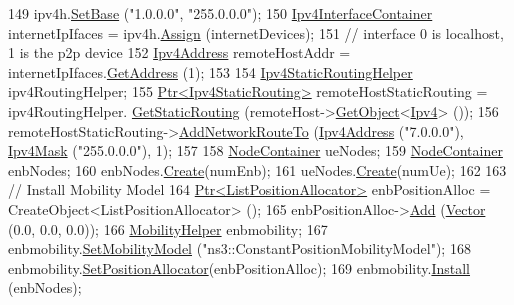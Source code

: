 \begin{DoxyCode}
149   ipv4h.\hyperlink{classns3_1_1Ipv4AddressHelper_acf7b16dd25bac67e00f5e25f90a9a035}{SetBase} (\textcolor{stringliteral}{"1.0.0.0"}, \textcolor{stringliteral}{"255.0.0.0"});
150   \hyperlink{classns3_1_1Ipv4InterfaceContainer}{Ipv4InterfaceContainer} internetIpIfaces = ipv4h.\hyperlink{classns3_1_1Ipv4AddressHelper_af8e7f4a1a7e74c00014a1eac445a27af}{Assign} (internetDevices);
151   \textcolor{comment}{// interface 0 is localhost, 1 is the p2p device}
152   \hyperlink{classns3_1_1Ipv4Address}{Ipv4Address} remoteHostAddr = internetIpIfaces.\hyperlink{classns3_1_1Ipv4InterfaceContainer_ae63208dcd222be986822937ee4aa828c}{GetAddress} (1);
153 
154   \hyperlink{classns3_1_1Ipv4StaticRoutingHelper}{Ipv4StaticRoutingHelper} ipv4RoutingHelper;
155   \hyperlink{classns3_1_1Ptr}{Ptr<Ipv4StaticRouting>} remoteHostStaticRouting = ipv4RoutingHelper.
      \hyperlink{classns3_1_1Ipv4StaticRoutingHelper_a731206e50d305695dac7fb2ef963a4bb}{GetStaticRouting} (remoteHost->\hyperlink{classns3_1_1Object_a13e18c00017096c8381eb651d5bd0783}{GetObject}<\hyperlink{classns3_1_1Ipv4}{Ipv4}> ());
156   remoteHostStaticRouting->\hyperlink{classns3_1_1Ipv4StaticRouting_a8bf5eaa7ba49fe33c78c70d5560b6c39}{AddNetworkRouteTo} (\hyperlink{classns3_1_1Ipv4Address}{Ipv4Address} (\textcolor{stringliteral}{"7.0.0.0"}), 
      \hyperlink{classns3_1_1Ipv4Mask}{Ipv4Mask} (\textcolor{stringliteral}{"255.0.0.0"}), 1);
157 
158   \hyperlink{classns3_1_1NodeContainer}{NodeContainer} ueNodes;
159   \hyperlink{classns3_1_1NodeContainer}{NodeContainer} enbNodes;
160   enbNodes.\hyperlink{classns3_1_1NodeContainer_a787f059e2813e8b951cc6914d11dfe69}{Create}(numEnb);
161   ueNodes.\hyperlink{classns3_1_1NodeContainer_a787f059e2813e8b951cc6914d11dfe69}{Create}(numUe);
162 
163   \textcolor{comment}{// Install Mobility Model}
164   \hyperlink{classns3_1_1Ptr}{Ptr<ListPositionAllocator>} enbPositionAlloc = 
      CreateObject<ListPositionAllocator> ();
165   enbPositionAlloc->\hyperlink{classns3_1_1ListPositionAllocator_a460e82f015ac012a73ba0ea0cccb3486}{Add} (\hyperlink{classns3_1_1Vector3D_a7e59b47bc94c9cb1dadff68c1d0112d8}{Vector} (0.0, 0.0, 0.0));
166   \hyperlink{classns3_1_1MobilityHelper}{MobilityHelper} enbmobility;
167   enbmobility.\hyperlink{classns3_1_1MobilityHelper_a030275011b6f40682e70534d30280aba}{SetMobilityModel} (\textcolor{stringliteral}{"ns3::ConstantPositionMobilityModel"});
168   enbmobility.\hyperlink{classns3_1_1MobilityHelper_ac59d5295076be3cc11021566713a28c5}{SetPositionAllocator}(enbPositionAlloc);
169   enbmobility.\hyperlink{classns3_1_1MobilityHelper_a07737960ee95c0777109cf2994dd97ae}{Install} (enbNodes);

\end{DoxyCode}
